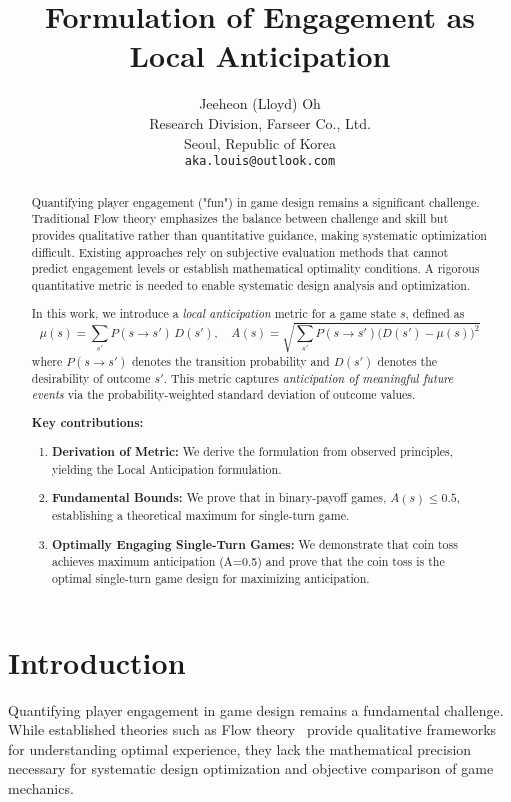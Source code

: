 \documentclass{article}
\title{Formulation of Engagement as Local Anticipation}
\author{
  Jeeheon (Lloyd) Oh\\
  Research Division, Farseer Co., Ltd.\\
  Seoul, Republic of Korea\\
  \texttt{aka.louis@outlook.com}
}
\begin{document}
\maketitle

\begin{abstract}
Quantifying player engagement ("fun") in game design remains a significant challenge. Traditional Flow theory emphasizes the balance between challenge and skill but provides qualitative rather than quantitative guidance, making systematic optimization difficult. Existing approaches rely on subjective evaluation methods that cannot predict engagement levels or establish mathematical optimality conditions. A rigorous quantitative metric is needed to enable systematic design analysis and optimization.

In this work, we introduce a \emph{local anticipation} metric for a game state $s$, defined as
\[
\mu(s) = \sum_{s'} P(s \to s')\,D(s'), \quad
A(s) = \sqrt{\sum_{s'} P(s \to s')\bigl(D(s') - \mu(s)\bigr)^2}
\]
where $P(s\to s')$ denotes the transition probability and $D(s')$ denotes the desirability of outcome $s'$. This metric captures \emph{anticipation of meaningful future events} via the probability-weighted standard deviation of outcome values.

\textbf{Key contributions:}
\begin{enumerate}
    \item \textbf{Derivation of Metric:} We derive the formulation from observed principles, yielding the Local Anticipation formulation.
    \item \textbf{Fundamental Bounds:} We prove that in binary-payoff games, $A(s) \le 0.5$, establishing a theoretical maximum for single-turn game.
    \item \textbf{Optimally Engaging Single-Turn Games:} We demonstrate that coin toss achieves maximum anticipation (A=0.5) and prove that the coin toss is the optimal single-turn game design for maximizing anticipation.
\end{enumerate}
\end{abstract}


\section{Introduction}

Quantifying player engagement in game design remains a fundamental challenge. While established theories such as Flow theory~\cite{csikszentmihalyi1990flow} provide qualitative frameworks for understanding optimal experience, they lack the mathematical precision necessary for systematic design optimization and objective comparison of game mechanics.
\end{document}
